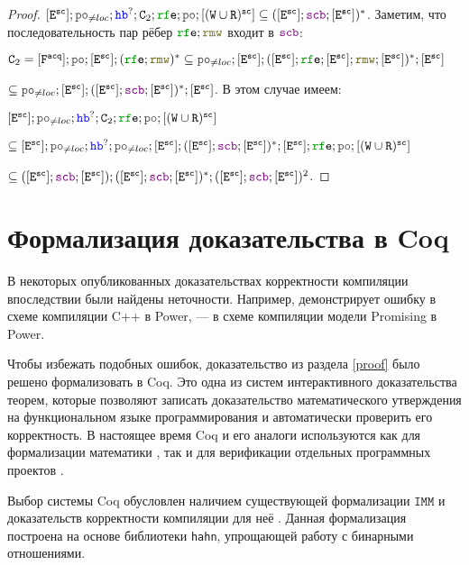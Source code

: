 \documentclass[14pt]{matmex-diploma-custom}
\newcommand{\Fa}{\lF^{\acq}}
\newcommand{\IMM}{\mathtt{IMM}}
\begin{document}
\begin{proof}
    $[\lE^{\sco}]; \lPO_{\neq loc} ; \lHB^?; \CA_2; \lRFE; \lPO ; [(\lW \cup \lR)^{\sco}]\subseteq  ([\lE^{\sco}] ; \lSCB ; [\lE^{\sco}])^{*}$. Заметим, что последовательность пар рёбер $\lRFE ; \lRMW$ входит в $\lSCB$: 

    $\CA_2=[\Fa] ; \lPO ; [\lE^{\sco}] ; (\lRFE ; \lRMW)^{*} \subseteq \lPO_{\neq loc}; [\lE^{\sco}] ; ([\lE^{\sco}] ; \lRFE; [\lE^{\sco}];  \lRMW; [\lE^{\sco}])^{*}; [\lE^{\sco}]$

    $\subseteq \lPO_{\neq loc}; [\lE^{\sco}] ; ([\lE^{\sco}] ; \lSCB ; [\lE^{\sco}])^{*}; [\lE^{\sco}]$. В этом случае имеем:

    $[\lE^{\sco}]; \lPO_{\neq loc} ; \lHB^?; \CA_2; \lRFE; \lPO ; [(\lW \cup \lR)^{\sco}]$

    $\subseteq [\lE^{\sco}]; \lPO_{\neq loc} ; \lHB^?; \lPO_{\neq loc}; [\lE^{\sco}] ; ([\lE^{\sco}] ; \lSCB ; [\lE^{\sco}])^{*}; [\lE^{\sco}]; \lRFE; \lPO ; [(\lW \cup \lR)^{\sco}]$

    $\subseteq ([\lE^{\sco}] ; \lSCB ; [\lE^{\sco}]) ; ([\lE^{\sco}] ; \lSCB ; [\lE^{\sco}])^{*}; ([\lE^{\sco}] ; \lSCB ; [\lE^{\sco}])^2$. \qedhere  
  
\end{proof}

\section{Формализация доказательства в Coq}

В некоторых опубликованных доказательствах корректности компиляции впоследствии были найдены неточности. Например, \cite{rc11} демонстрирует ошибку в схеме компиляции C++ в Power, \cite{imm} --- в схеме компиляции модели Promising в Power.

Чтобы избежать подобных ошибок, доказательство из раздела \ref{proof} было решено формализовать в Coq. Это одна из систем интерактивного доказательства теорем, которые позволяют записать доказательство математического утверждения на функциональном языке программирования и автоматически проверить его корректность. В настоящее время Coq и его аналоги используются как для формализации математики \cite{four-color}, так и для верификации отдельных программных проектов \cite{compcert}. 

Выбор системы Coq обусловлен наличием существующей формализации $\IMM$ и доказательств корректности компиляции для неё \cite{imm-repo}. Данная формализация построена на основе библиотеки \texttt{hahn}, упрощающей работу с бинарными отношениями.
\end{document}
